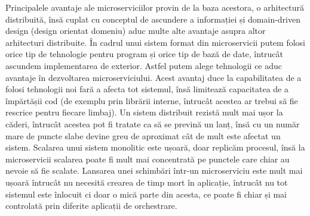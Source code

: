 Principalele avantaje ale microserviciilor provin de la baza acestora, o arhitectură distribuită,
însă cuplat cu conceptul de ascundere a informației și domain-driven design (design orientat domeniu)
aduc multe alte avantaje asupra altor arhitecturi distribuite. În cadrul unui sistem format din microservicii
putem folosi orice tip de tehnologie pentru program și orice tip de bază de date, întrucât
ascundem implementarea de exterior. Astfel putem alege tehnologii ce aduc avantaje în 
dezvoltarea microserviciului. Acest avantaj duce la capabilitatea de a folosi tehnologii noi
fară a afecta tot sistemul, însă limitează capacitatea de a împărtășii cod (de exemplu prin
librării interne, întrucât acestea ar trebui să fie rescrice pentru fiecare limbaj). 
Un sistem distribuit rezistă mult mai ușor la căderi, întrucât acestea pot fi tratate ca să
se prevină un lanț, însă cu un număr mare de puncte slabe devine greu de aproximat cât de
mult este afectat un sistem. Scalarea unui sistem monolitic este ușoară, doar replicăm procesul,
însă la microservicii scalarea poate fi mult mai concentrată pe punctele care chiar au nevoie să fie
scalate. Lansarea unei schimbări într-un microserviciu este mult mai ușoară întrucât nu necesită
crearea de timp mort în aplicație, întrucât nu tot sistemul este înlocuit ci doar o mică parte din acesta,
ce poate fi chiar și mai controlată prin diferite aplicații de orchestrare.

